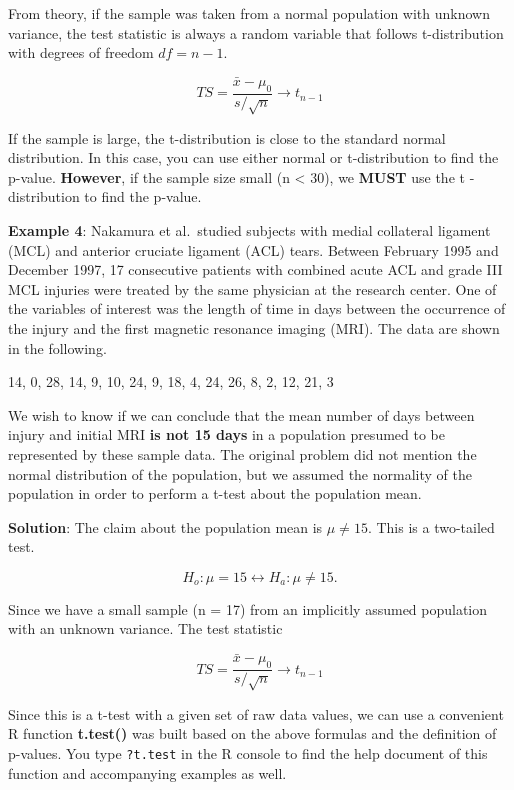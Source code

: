 \documentclass[
]{book}
\begin{document}
From theory, if the sample was taken from a normal population with unknown variance, the test statistic is always a random variable that follows t-distribution with degrees of freedom \(df = n-1\).

\[
TS = \frac{\bar{x}-\mu_0}{s/\sqrt{n}} \to t_{n-1}
\]

If the sample is large, the t-distribution is close to the standard normal distribution. In this case, you can use either normal or t-distribution to find the p-value. \textbf{However}, if the sample size small (n \textless{} 30), we \textbf{MUST} use the t -distribution to find the p-value.

\textbf{Example 4}: Nakamura et al.~studied subjects with medial collateral ligament (MCL) and anterior cruciate ligament (ACL) tears. Between February 1995 and December 1997, 17 consecutive patients with combined acute ACL and grade III MCL injuries were treated by the same physician at the research center. One of the variables of interest was the length of time in days between the occurrence of the injury and the first magnetic resonance imaging (MRI). The data are shown in the following.

14, 0, 28, 14, 9, 10, 24, 9, 18, 4, 24, 26, 8, 2, 12, 21, 3

We wish to know if we can conclude that the mean number of days between injury and initial MRI \textbf{is not 15 days} in a population presumed to be represented by these sample data. The original problem did not mention the normal distribution of the population, but we assumed the normality of the population in order to perform a t-test about the population mean.

\textbf{Solution}: The claim about the population mean is \(\mu \ne 15\). This is a two-tailed test.

\[
H_o: \mu = 15  \leftrightarrow  H_a: \mu \ne 15.
\]

Since we have a small sample (n = 17) from an implicitly assumed population with an unknown variance. The test statistic

\[
TS = \frac{\bar{x} - \mu_0}{s/\sqrt{n}} \to t_{n-1}
\]

Since this is a t-test with a given set of raw data values, we can use a convenient R function \textbf{t.test()} was built based on the above formulas and the definition of p-values. You type \texttt{?t.test} in the R console to find the help document of this function and accompanying examples as well.
\end{document}
